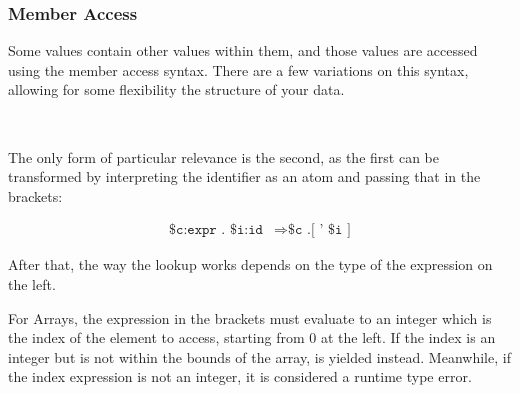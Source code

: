 \subsubsection{Member Access}
\label{sec:member-access}

Some values contain other values within them, and those values are accessed using
the member access syntax. There are a few variations on this syntax, allowing for
some flexibility the structure of your data.

\begin{bnf*}
     \\
\end{bnf*}

The only form of particular relevance is the second, as the first can be
transformed by interpreting the identifier as an atom and passing that
in the brackets:

\begin{align*}
    \texttt{\$c:expr . \$i:id} & \Rightarrow \texttt{\$c .[ ' \$i ]} %
\end{align*}

After that, the way the lookup works depends on the type of the expression
on the left.

For Arrays, the expression in the brackets must evaluate to an integer
which is the index of the element to access, starting from 0 at the left.
If the index is an integer but is not within the bounds of the array,
 is yielded instead. Meanwhile, if the index expression is
not an integer, it is considered a runtime type error.

\begin{prooftree}
\end{prooftree}

\begin{prooftree}
\end{prooftree}

